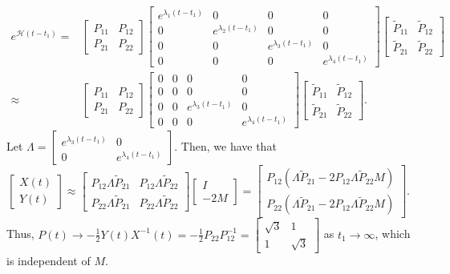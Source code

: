 \documentclass[11pt]{report}
\begin{document}
\begin{align*}
e^{\mathcal{H}(t-t_1)} = & \begin{bmatrix}P_{11} & P_{12}\\P_{21} & P_{22}\end{bmatrix} \begin{bmatrix}e^{\lambda_1(t-t_1)} & 0 & 0 & 0\\ 0 & e^{\lambda_2(t-t_1)} & 0 & 0\\ 0 & 0 & e^{\lambda_3(t-t_1)} & 0\\0 & 0 & 0 & e^{\lambda_4(t-t_1)}\end{bmatrix} \begin{bmatrix}\tilde{P}_{11} & \tilde{P}_{12}\\\tilde{P}_{21} & \tilde{P}_{22}\end{bmatrix}\\ \approx & \begin{bmatrix}P_{11} & P_{12}\\P_{21} & P_{22}\end{bmatrix} \begin{bmatrix}0 & 0 & 0 & 0\\ 0 & 0 & 0 & 0\\ 0 & 0 & e^{\lambda_3(t-t_1)} & 0\\0 & 0 & 0 & e^{\lambda_4(t-t_1)}\end{bmatrix} \begin{bmatrix}\tilde{P}_{11} & \tilde{P}_{12}\\\tilde{P}_{21} & \tilde{P}_{22}\end{bmatrix}.
\end{align*}
Let $\Lambda = \begin{bmatrix}e^{\lambda_3(t-t_1)} & 0\\0 & e^{\lambda_4(t-t_1)}\end{bmatrix}$. Then, we have that
\[
\begin{bmatrix}X(t)\\Y(t)\end{bmatrix} \approx \begin{bmatrix}P_{12}\Lambda\tilde{P}_{21} & P_{12}\Lambda\tilde{P}_{22}\\P_{22}\Lambda\tilde{P}_{21} & P_{22}\Lambda\tilde{P}_{22}\end{bmatrix} \begin{bmatrix}I\\-2M\end{bmatrix} = \begin{bmatrix}P_{12}(\Lambda\tilde{P}_{21}-2P_{12}\Lambda\tilde{P}_{22}M)\\P_{22}(\Lambda\tilde{P}_{21}-2P_{12}\Lambda\tilde{P}_{22}M)\end{bmatrix}.
\]
Thus, $P(t) \to -\frac{1}{2}Y(t)X^{-1}(t) = -\frac{1}{2}P_{22}P_{12}^{-1} = \begin{bmatrix}\sqrt{3} & 1\\ 1 & \sqrt{3}\end{bmatrix}$ as $t_1 \to \infty$, which is independent of $M$.
\end{document}

